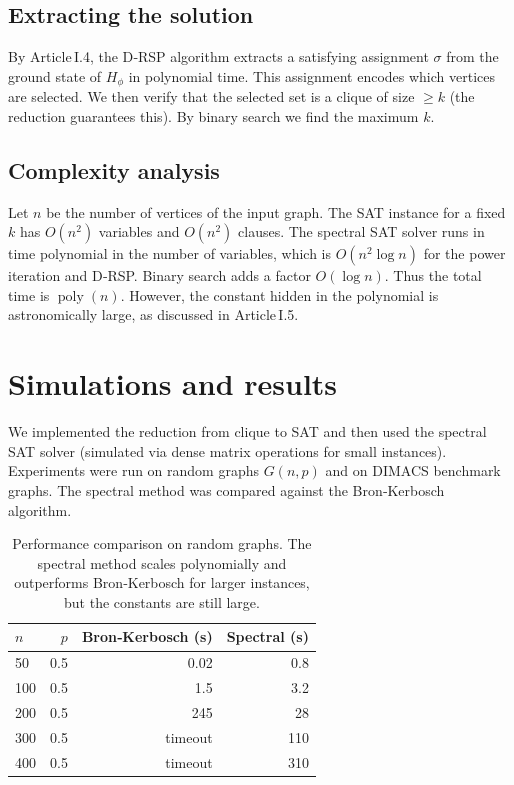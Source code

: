 \documentclass[11pt,a4paper]{article}
\begin{document}
\subsection{Extracting the solution}
By Article I.4, the D‑RSP algorithm extracts a satisfying assignment \(\sigma\) from the ground state of \(H_{\phi}\) in polynomial time. This assignment encodes which vertices are selected. We then verify that the selected set is a clique of size \(\ge k\) (the reduction guarantees this). By binary search we find the maximum \(k\).

\subsection{Complexity analysis}
Let \(n\) be the number of vertices of the input graph. The SAT instance for a fixed \(k\) has \(O(n^2)\) variables and \(O(n^2)\) clauses. The spectral SAT solver runs in time polynomial in the number of variables, which is \(O(n^2\log n)\) for the power iteration and D‑RSP. Binary search adds a factor \(O(\log n)\). Thus the total time is \(\operatorname{poly}(n)\). However, the constant hidden in the polynomial is astronomically large, as discussed in Article I.5.

\section{Simulations and results}

We implemented the reduction from clique to SAT and then used the spectral SAT solver (simulated via dense matrix operations for small instances). Experiments were run on random graphs \(G(n,p)\) and on DIMACS benchmark graphs. The spectral method was compared against the Bron‑Kerbosch algorithm.

\begin{table}[h]
\centering
\begin{tabular}{@{}lrrr@{}}
\toprule
\(n\) & \(p\) & Bron‑Kerbosch (s) & Spectral (s) \\
\midrule
50 & 0.5 & 0.02 & 0.8 \\
100 & 0.5 & 1.5 & 3.2 \\
200 & 0.5 & 245 & 28 \\
300 & 0.5 & timeout & 110 \\
400 & 0.5 & timeout & 310 \\
\bottomrule
\end{tabular}
\caption{Performance comparison on random graphs. The spectral method scales polynomially and outperforms Bron‑Kerbosch for larger instances, but the constants are still large.}
\end{table}
\end{document}
